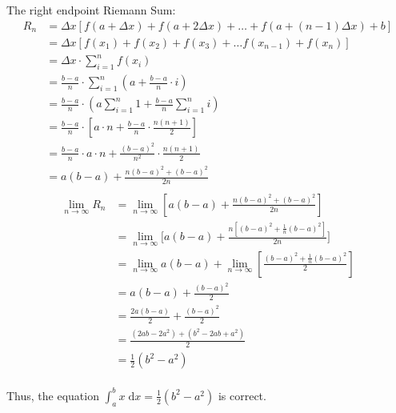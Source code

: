 \documentclass[12pt]{article}
\begin{document}
\begin{enumerate}
    The right endpoint Riemann Sum:
    \begin{align*}
    R_n
    &= \Delta x\left[f\left(a+\Delta x\right)+ f\left(a+2\Delta x\right)
    +\dots+ f\left(a+\left(n-1\right)\Delta x\right)+b \right]\\
    &= \Delta x\left[f\left(x_1\right)+ f\left(x_2\right)+ f\left(x_3\right)+\dots f\left(x_{n-1}\right)+ f\left(x_n\right) \right] \\
    &=\Delta x\cdot\sum_{i=1}^{n}f\left(x_i\right)\\
    &=\frac{b-a}{n}\cdot\sum_{i=1}^{n}\left(a +\frac{b-a}{n}\cdot i \right)\\
    &=\frac{b-a}{n}\cdot\left(a\sum_{i=1}^{n}1+\frac{b-a}{n}\sum_{i=1}^{n}i\right)\\
    &=\frac{b-a}{n}\cdot\left[a \cdot n+ \frac{b-a}{n}\cdot \frac{n\left(n+1\right)}{2} \right]\\
    &=\frac{b-a}{n}\cdot a\cdot n+ \frac{\left(b-a\right)^2}{n^2}\cdot \frac{n\left(n+1\right)}{2} \\
    &=a\left(b-a \right)+ \frac{n\left(b-a\right)^2+\left(b-a\right)^2}{2n} \\
\end{align*}
\begin{align*}
    \lim_{n\to\infty}R_n &=\lim_{n\to\infty}\left[a\left(b-a \right)+ \frac{n\left(b-a\right)^2+\left(b-a\right)^2}{2n}\right]\\
    &=\lim_{n\to\infty} \Bigg[ a\left(b-a \right)+ \frac{n \left[ \left( b-a\right)^2+ \frac{1}{n} \left(b-a\right)^2 \right]}{2n} \Bigg]\\
    &=\lim_{n\to\infty} a\left(b-a \right)+ \lim_{n\to\infty}\left[ \frac{ \left( b-a\right)^2+ \frac{1}{n} \left(b-a\right)^2}{2}\right] \\
    &=a\left(b-a \right)+ \frac{ \left( b-a\right)^2}{2} \\
    &=\frac{2a\left(b-a \right)}{2}+ \frac{ \left( b-a\right)^2}{2} \\
    &=\frac{\left(2ab-2a^2 \right)+ \left(b^2-2ab+a^2 \right)}{2} \\
    &=\frac{1}{2} \left(b^2-a^2 \right) \\
\end{align*} \par
    Thus, the equation $\int_{a}^b x \; \mathrm{d}x= \frac{1}{2} \left(b^2-a^2 \right)$ is correct.\paragraph{}
    

\end{enumerate}
\end{document}
